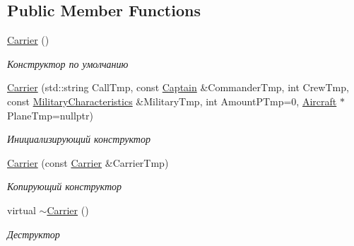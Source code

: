 \subsection*{Public Member Functions}
\begin{DoxyCompactItemize}
\item 
\mbox{\label{class_aircraft_carrier_group_1_1_carrier_a6a23c303d5cdf5c336b6cad9ba883340}} 
\mbox{\hyperlink{class_aircraft_carrier_group_1_1_carrier_a6a23c303d5cdf5c336b6cad9ba883340}{Carrier}} ()
\begin{DoxyCompactList}\small\item\em Конструктор по умолчанию \end{DoxyCompactList}\item 
\mbox{\hyperlink{class_aircraft_carrier_group_1_1_carrier_a014facb4517f7f73f860d812099619e1}{Carrier}} (std\+::string Call\+Tmp, const \mbox{\hyperlink{struct_aircraft_carrier_group_1_1_captain}{Captain}} \&Commander\+Tmp, int Crew\+Tmp, const \mbox{\hyperlink{class_aircraft_carrier_group_1_1_military_characteristics}{Military\+Characteristics}} \&Military\+Tmp, int Amount\+P\+Tmp=0, \mbox{\hyperlink{class_aircraft_carrier_group_1_1_aircraft}{Aircraft}} $\ast$Plane\+Tmp=nullptr)
\begin{DoxyCompactList}\small\item\em Инициализирующий конструктор \end{DoxyCompactList}\item 
\mbox{\hyperlink{class_aircraft_carrier_group_1_1_carrier_a9f8e0ddb2e14de4d33cdb85173a5874c}{Carrier}} (const \mbox{\hyperlink{class_aircraft_carrier_group_1_1_carrier}{Carrier}} \&Carrier\+Tmp)
\begin{DoxyCompactList}\small\item\em Копирующий конструктор \end{DoxyCompactList}\item 
\mbox{\label{class_aircraft_carrier_group_1_1_carrier_a1bd0a5fd4c5237f0e19aeb93dead2d18}} 
virtual \mbox{\hyperlink{class_aircraft_carrier_group_1_1_carrier_a1bd0a5fd4c5237f0e19aeb93dead2d18}{$\sim$\+Carrier}} ()
\begin{DoxyCompactList}\small\item\em Деструктор \end{DoxyCompactList}\item 
\mbox{\label{class_aircraft_carrier_group_1_1_carrier_a1b6a8d9f9d78721cc382c870aa09263a}} 

\end{DoxyCompactItemize}
